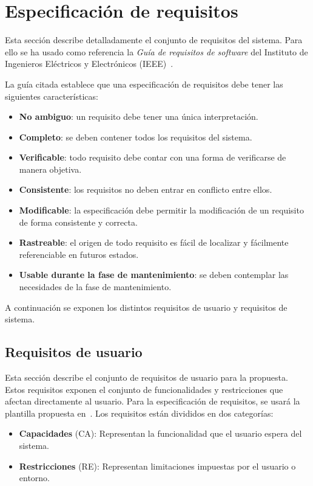 \section{Especificación de requisitos}\label{sec:requirements}

Esta sección describe detalladamente el conjunto de requisitos del sistema. Para ello se ha usado como referencia la \textit{Guía de requisitos de software} del Instituto de Ingenieros Eléctricos y Electrónicos (IEEE)~\cite{requirements}.

La guía citada establece que una especificación de requisitos debe tener las siguientes características:
\begin{itemize}
\item \textbf{No ambiguo}: un requisito debe tener una única interpretación.
\item \textbf{Completo}: se deben contener todos los requisitos del sistema.
\item \textbf{Verificable}: todo requisito debe contar con una forma de verificarse de manera objetiva.
\item \textbf{Consistente}: los requisitos no deben entrar en conflicto entre ellos.
\item \textbf{Modificable}: la especificación debe permitir la modificación de un requisito de forma consistente y correcta.
\item \textbf{Rastreable}: el origen de todo requisito es fácil de localizar y fácilmente referenciable en futuros estados.
\item \textbf{Usable durante la fase de mantenimiento}: se deben contemplar las necesidades de la fase de mantenimiento.
\end{itemize}

A continuación se exponen los distintos requisitos de usuario y requisitos de sistema.

\subsection{Requisitos de usuario}\label{subsec:user-req}

Esta sección describe el conjunto de requisitos de usuario para la propuesta.
Estos requisitos exponen el conjunto de funcionalidades y restricciones que
afectan directamente al usuario. Para la especificación de requisitos, se usará
la plantilla propuesta en~\cite{luisda}. Los requisitos están divididos en dos
categorías:

\begin{itemize}
\item \textbf{Capacidades} (CA): Representan la funcionalidad que el usuario espera del sistema.
\item \textbf{Restricciones} (RE): Representan limitaciones impuestas por el usuario o entorno.
\end{itemize}

